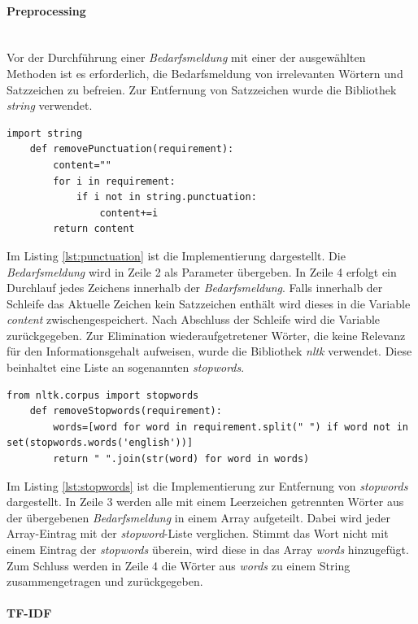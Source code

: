 \paragraph{Preprocessing}\mbox{}\\
Vor der Durchführung einer \emph{Bedarfsmeldung} mit einer der ausgewählten Methoden ist es erforderlich, die Bedarfsmeldung von irrelevanten Wörtern und Satzzeichen zu befreien. Zur Entfernung von Satzzeichen wurde die Bibliothek \emph{string} verwendet.
\begin{lstlisting}[caption={Implementation der Methode removePunctuation() des Moduls \emph{preprocessing.py}}, label=lst:punctuation]
	import string
	def removePunctuation(requirement):
		content=""
		for i in requirement: 
			if i not in string.punctuation:
				content+=i    
		return content
\end{lstlisting}
Im Listing \ref{lst:punctuation} ist die Implementierung dargestellt. Die \emph{Bedarfsmeldung} wird in Zeile 2 als Parameter übergeben. In Zeile 4 erfolgt ein Durchlauf jedes Zeichens innerhalb der \emph{Bedarfsmeldung}. Falls innerhalb der Schleife das Aktuelle Zeichen kein Satzzeichen enthält wird dieses in die Variable \emph{content} zwischengespeichert. Nach Abschluss der Schleife wird die Variable zurückgegeben. Zur Elimination wiederaufgetretener Wörter, die keine Relevanz für den Informationsgehalt aufweisen, wurde die Bibliothek \emph{nltk} verwendet. Diese beinhaltet eine Liste an sogenannten \emph{stopwords}.
\begin{lstlisting}[caption={Implementation der Methode removeStopwords() des Moduls \emph{preprocessing.py}}, label=lst:stopwords]
	from nltk.corpus import stopwords
	def removeStopwords(requirement):
		words=[word for word in requirement.split(" ") if word not in set(stopwords.words('english'))]
		return " ".join(str(word) for word in words)
\end{lstlisting}
Im Listing \ref{lst:stopwords} ist die Implementierung zur Entfernung von \emph{stopwords} dargestellt. In Zeile 3 werden alle mit einem Leerzeichen getrennten Wörter aus der übergebenen \emph{Bedarfsmeldung} in einem Array aufgeteilt. Dabei wird jeder Array-Eintrag mit der \emph{stopword}-Liste verglichen. Stimmt das Wort nicht mit einem Eintrag der \emph{stopwords} überein, wird diese in das Array \emph{words} hinzugefügt. Zum Schluss werden in Zeile 4 die Wörter aus \emph{words} zu einem String zusammengetragen und zurückgegeben.
\paragraph{TF-IDF}\mbox{}\\

